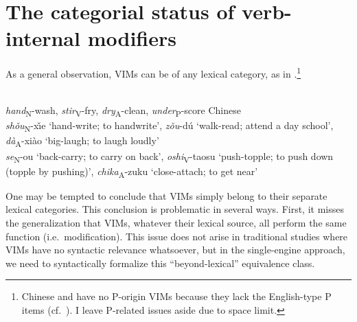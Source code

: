 \documentclass[output=paper]{langsci/langscibook}
\begin{document}
\section{The categorial status of verb-internal modifiers}\label{sec2}

As a general observation, \glspl{VIM} can be of any lexical category, as in .\footnote{Chinese and 
    have no P-origin \glspl{VIM} because they lack the English-type P items
    (cf.\ \citealt{HuangEtal2009,Tsujimura2013,Song2017}). I leave P-related
    issues aside due to space limit.}

\ea\label{ex:lexcat}
\ea {}\\ \textit{hand}\textsubscript{N}-wash,
\textit{stir}\textsubscript{V}-fry, \textit{dry}\textsubscript{A}-clean,
\textit{under}\textsubscript{P}-score
\ex Chinese\\ \textit{sh\v{o}u}\textsubscript{N}-x\v{\i}e `hand-write; to
handwrite', \textit{zǒu}-dú \enquote*{walk-read; attend a day school},
\textit{d\`{a}}\textsubscript{A}-xi\`{a}o `big-laugh; to laugh loudly'
\ex {}\\ \textit{se}\textsubscript{N}-ou `back-carry; to carry on back',
\textit{oshi}\textsubscript{V}-taosu `push-topple; to push down (topple by
pushing)', \textit{chika}\textsubscript{A}-zuku `close-attach; to get near'
\z
\z

\noindent %

One may be tempted to conclude that \glspl{VIM} simply belong to their separate
lexical categories. This conclusion is problematic in several ways. First, it
misses the generalization that \glspl{VIM}, whatever their lexical source, all perform
the same function (i.e.\ modification). This issue does not arise in traditional
studies where \glspl{VIM} have no syntactic relevance whatsoever, but in the
single-engine approach, we need to syntactically formalize this
``beyond-lexical'' equivalence class.
\end{document}

